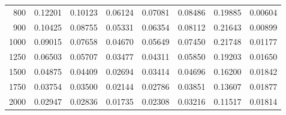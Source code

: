 \begin{table}[ht]
\begin{tabular}{r|c|c|c|c|c|c|c}
      800 & 0.12201 & 0.10123 & 0.06124 & 0.07081 & 0.08486 & 0.19885 & 0.00604 \\
      900 & 0.10425 & 0.08755 & 0.05331 & 0.06354 & 0.08112 & 0.21643 & 0.00899 \\
     1000 & 0.09015 & 0.07658 & 0.04670 & 0.05649 & 0.07450 & 0.21748 & 0.01177 \\
     1250 & 0.06503 & 0.05707 & 0.03477 & 0.04311 & 0.05850 & 0.19203 & 0.01650 \\
     1500 & 0.04875 & 0.04409 & 0.02694 & 0.03414 & 0.04696 & 0.16200 & 0.01842 \\
     1750 & 0.03754 & 0.03500 & 0.02144 & 0.02786 & 0.03851 & 0.13607 & 0.01877 \\
     2000 & 0.02947 & 0.02836 & 0.01735 & 0.02308 & 0.03216 & 0.11517 & 0.01814 \\ \cline{1-8}
    \end{tabular}
    \label{tab:XRayEffOCX3}
\end{table}

